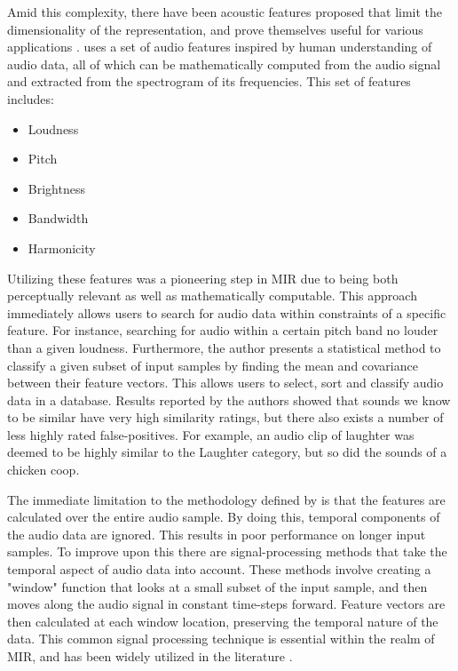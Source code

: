 \documentclass[twoside]{article}
\begin{document}
\begin{multicols}{2}
Amid this complexity, there have been acoustic features proposed that limit the dimensionality of the representation, and prove themselves useful for various applications \citep{Wold96,Typke04,Prechelt01}. \cite{Wold96} uses a set of audio features inspired by human understanding of audio data, all of which can be mathematically computed from the audio signal and extracted from the spectrogram of its frequencies. This set of features includes: 
\begin{itemize}
\item Loudness
\item Pitch
\item Brightness
\item Bandwidth
\item Harmonicity
\end{itemize}
Utilizing these features was a pioneering step in MIR due to being both perceptually relevant as well as mathematically computable. This approach immediately allows users to search for audio data within constraints of a specific feature. For instance, searching for audio within a certain pitch band no louder than a given loudness. Furthermore, the author presents a statistical method to classify a given subset of input samples by finding the mean and covariance between their feature vectors. This allows users to select, sort and classify audio data in a database. Results reported by the authors showed that sounds we know to be similar have very high similarity ratings, but there also exists a number of less highly rated false-positives. For example, an audio clip of laughter was deemed to be highly similar to the Laughter category, but so did the sounds of a chicken coop.

The immediate limitation to the methodology defined by \citet{Wold96} is that the features are calculated over the entire audio sample. By doing this, temporal components of the audio data are ignored. This results in poor performance on longer input samples. To improve upon this there are signal-processing methods that take the temporal aspect of audio data into account. These methods involve creating a "window" function that looks at a small subset of the input sample, and then moves along the audio signal in constant time-steps forward. Feature vectors are then calculated at each window location, preserving the temporal nature of the data. This common signal processing technique is essential within the realm of MIR, and has been widely utilized in the literature \citet{Foote1997,Lidy05,Tzanetakis02,Hamel2010LearningFeatures,mierswa2005automatic}.


\end{multicols}
\end{document}
